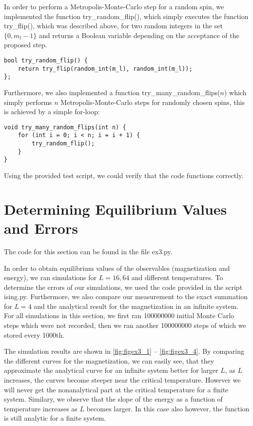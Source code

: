 \documentclass[a4paper,10pt,bibtotoc]{scrartcl}
\begin{document}
In order to perform a Metropolis-Monte-Carlo step for a random spin, we implemented the function try\_random\_flip(), which simply executes the function try\_flip(), which was described above, for two random integers in the set $\{0,m_l-1\}$ and returns a Boolean variable depending on the acceptance of the proposed step.
\begin{lstlisting}
bool try_random_flip() {
    return try_flip(random_int(m_l), random_int(m_l));
};
\end{lstlisting}
Furthermore, we also implemented a function try\_many\_random\_flips($n$) which simply performs $n$ Metropolis-Monte-Carlo steps for randomly chosen spins, this is achieved by a simple for-loop:
\begin{lstlisting}
void try_many_random_flips(int n) {
    for (int i = 0; i < n; i = i + 1) {
        try_random_flip();
    }
}
\end{lstlisting}
Using the provided test script, we could verify that the code functions correctly.


\section{Determining Equilibrium Values and Errors}
The code for this section can be found in the file ex3.py.

In order to obtain equilibrium values of the observables (magnetization and energy), we ran simulations for $L=16,64$ and different temperatures. 
To determine the errors of our simulations, we used the code provided in the script ising.py.
Furthermore, we also compare our measurement to the exact summation for $L=4$ and the analytical result for the magnetization in an infinite system.
For all simulations in this section, we first ran 100000000 initial Monte Carlo steps which were not recorded, then we ran another 100000000 steps of which we stored every 1000th.

The simulation results are shown in \autoref{fig:figex3_1} -- \autoref{fig:figex3_4}. 
By comparing the different curves for the magnetization, we can easily see, that they approximate the analytical curve for an infinite system better for larger $L$, as $L$ increases, the curves become steeper near the critical temperature.
However we will never get the nonanalytical part at the critical temperature for a finite system. 
Similary, we observe that the slope of the energy as a function of temperature increases as $L$ becomes larger.
In this case also however, the function is still analytic for a finite system.
\end{document}
